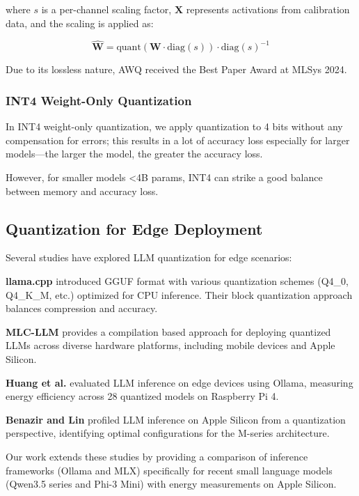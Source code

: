 \documentclass[conference]{IEEEtran}
\begin{document}
where $s$ is a per-channel scaling factor, $\mathbf{X}$ represents activations from calibration data, and the scaling is applied as:

\begin{equation}
\hat{\mathbf{W}} = \text{quant}(\mathbf{W} \cdot \text{diag}(s)) \cdot \text{diag}(s)^{-1}
\end{equation}

Due to its lossless nature, AWQ received the Best Paper Award at MLSys 2024.

\subsubsection{INT4 Weight-Only Quantization}

In INT4 weight-only quantization, we apply quantization to 4 bits without any compensation for errors; this results in a lot of accuracy loss especially for larger models---the larger the model, the greater the accuracy loss.

However, for smaller models <4B params, INT4 can strike a good balance between memory and accuracy loss.

\subsection{Quantization for Edge Deployment}

Several studies have explored LLM quantization for edge scenarios:

\textbf{llama.cpp} \cite{llamacpp2023} introduced GGUF format with various quantization schemes (Q4\_0, Q4\_K\_M, etc.) optimized for CPU inference. Their block quantization approach balances compression and accuracy.

\textbf{MLC-LLM} \cite{mlcllm2023} provides a compilation based approach for deploying quantized LLMs across diverse hardware platforms, including mobile devices and Apple Silicon.

\textbf{Huang et al.} \cite{huang2025llms} evaluated LLM inference on edge devices using Ollama, measuring energy efficiency across 28 quantized models on Raspberry Pi 4.

\textbf{Benazir and Lin} \cite{benazir2025profiling} profiled LLM inference on Apple Silicon from a quantization perspective, identifying optimal configurations for the M-series architecture.

Our work extends these studies by providing a comparison of inference frameworks (Ollama and MLX) specifically for recent small language models (Qwen3.5 series and Phi-3 Mini) with energy measurements on Apple Silicon.
\end{document}

